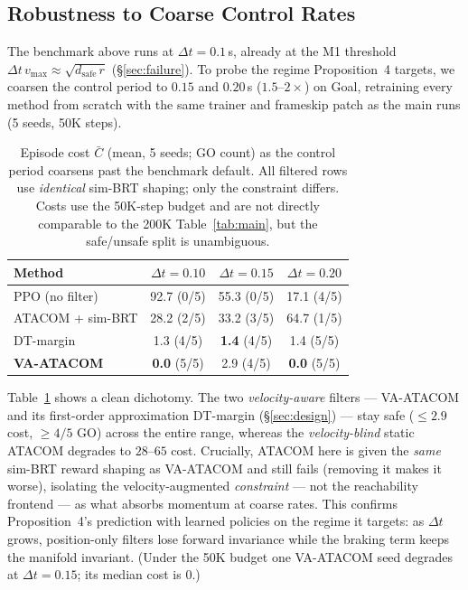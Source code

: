 \documentclass[letterpaper]{article}
\begin{document}
\subsection{Robustness to Coarse Control Rates}
\label{sec:coarse}

The benchmark above runs at $\Delta t{=}0.1$\,s, already at the M1 threshold $\Delta t\,v_{\max}\!\approx\!\sqrt{d_\text{safe}\,r}$ (\S\ref{sec:failure}). To probe the regime Proposition~4 targets, we coarsen the control period to $0.15$ and $0.20$\,s ($1.5$--$2\times$) on Goal, retraining every method from scratch with the same trainer and frameskip patch as the main runs (5 seeds, 50K steps).

\begin{table}[t]
\centering
\caption{Episode cost $\bar C$ (mean, 5 seeds; GO count) as the control period coarsens past the benchmark default. All filtered rows use \emph{identical} sim-BRT shaping; only the constraint differs. Costs use the 50K-step budget and are not directly comparable to the 200K Table~\ref{tab:main}, but the safe/unsafe split is unambiguous.}
\label{tab:coarse}
\begin{tabular}{lccc}
\toprule
Method & $\Delta t{=}0.10$ & $\Delta t{=}0.15$ & $\Delta t{=}0.20$ \\
\midrule
PPO (no filter)   & 92.7 (0/5) & 55.3 (0/5) & 17.1 (4/5) \\
ATACOM + sim-BRT  & 28.2 (2/5) & 33.2 (3/5) & 64.7 (1/5) \\
DT-margin         & 1.3 (4/5)  & \textbf{1.4} (4/5) & 1.4 (5/5) \\
\textbf{VA-ATACOM}& \textbf{0.0} (5/5) & 2.9 (4/5) & \textbf{0.0} (5/5) \\
\bottomrule
\end{tabular}
\end{table}

Table~\ref{tab:coarse} shows a clean dichotomy. The two \emph{velocity-aware} filters --- VA-ATACOM and its first-order approximation DT-margin (\S\ref{sec:design}) --- stay safe ($\le 2.9$ cost, $\ge 4/5$ GO) across the entire range, whereas the \emph{velocity-blind} static ATACOM degrades to $28$--$65$ cost. Crucially, ATACOM here is given the \emph{same} sim-BRT reward shaping as VA-ATACOM and still fails (removing it makes it worse), isolating the velocity-augmented \emph{constraint} --- not the reachability frontend --- as what absorbs momentum at coarse rates. This confirms Proposition~4's prediction with learned policies on the regime it targets: as $\Delta t$ grows, position-only filters lose forward invariance while the braking term keeps the manifold invariant. (Under the 50K budget one VA-ATACOM seed degrades at $\Delta t{=}0.15$; its median cost is $0$.)
\end{document}
